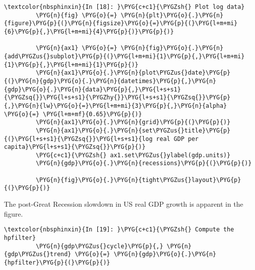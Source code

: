 \documentclass[letterpaper,10pt,openany,oneside,english]{sphinxmanual}
\begin{document}
%
\begin{Verbatim}[commandchars=\\\{\}]
\textcolor{nbsphinxin}{In [18]: }\PYG{c+c1}{\PYGZsh{} Plot log data}
         \PYG{n}{fig} \PYG{o}{=} \PYG{n}{plt}\PYG{o}{.}\PYG{n}{figure}\PYG{p}{(}\PYG{n}{figsize}\PYG{o}{=}\PYG{p}{(}\PYG{l+m+mi}{6}\PYG{p}{,}\PYG{l+m+mi}{4}\PYG{p}{)}\PYG{p}{)}
         
         \PYG{n}{ax1} \PYG{o}{=} \PYG{n}{fig}\PYG{o}{.}\PYG{n}{add\PYGZus{}subplot}\PYG{p}{(}\PYG{l+m+mi}{1}\PYG{p}{,}\PYG{l+m+mi}{1}\PYG{p}{,}\PYG{l+m+mi}{1}\PYG{p}{)}
         \PYG{n}{ax1}\PYG{o}{.}\PYG{n}{plot\PYGZus{}date}\PYG{p}{(}\PYG{n}{gdp}\PYG{o}{.}\PYG{n}{datetimes}\PYG{p}{,}\PYG{n}{gdp}\PYG{o}{.}\PYG{n}{data}\PYG{p}{,}\PYG{l+s+s1}{\PYGZsq{}}\PYG{l+s+s1}{\PYGZhy{}}\PYG{l+s+s1}{\PYGZsq{}}\PYG{p}{,}\PYG{n}{lw}\PYG{o}{=}\PYG{l+m+mi}{3}\PYG{p}{,}\PYG{n}{alpha} \PYG{o}{=} \PYG{l+m+mf}{0.65}\PYG{p}{)}
         \PYG{n}{ax1}\PYG{o}{.}\PYG{n}{grid}\PYG{p}{(}\PYG{p}{)}
         \PYG{n}{ax1}\PYG{o}{.}\PYG{n}{set\PYGZus{}title}\PYG{p}{(}\PYG{l+s+s1}{\PYGZsq{}}\PYG{l+s+s1}{log real GDP per capita}\PYG{l+s+s1}{\PYGZsq{}}\PYG{p}{)}
         \PYG{c+c1}{\PYGZsh{} ax1.set\PYGZus{}ylabel(gdp.units)}
         \PYG{n}{gdp}\PYG{o}{.}\PYG{n}{recessions}\PYG{p}{(}\PYG{p}{)}
         
         \PYG{n}{fig}\PYG{o}{.}\PYG{n}{tight\PYGZus{}layout}\PYG{p}{(}\PYG{p}{)}
\end{Verbatim}

\noindent{}

The post-Great Recession slowdown in US real GDP growth is apparent in
the figure.

%
\begin{Verbatim}[commandchars=\\\{\}]
\textcolor{nbsphinxin}{In [19]: }\PYG{c+c1}{\PYGZsh{} Compute the hpfilter}
         \PYG{n}{gdp\PYGZus{}cycle}\PYG{p}{,} \PYG{n}{gdp\PYGZus{}trend} \PYG{o}{=} \PYG{n}{gdp}\PYG{o}{.}\PYG{n}{hpfilter}\PYG{p}{(}\PYG{p}{)}
\end{Verbatim}
\end{document}
